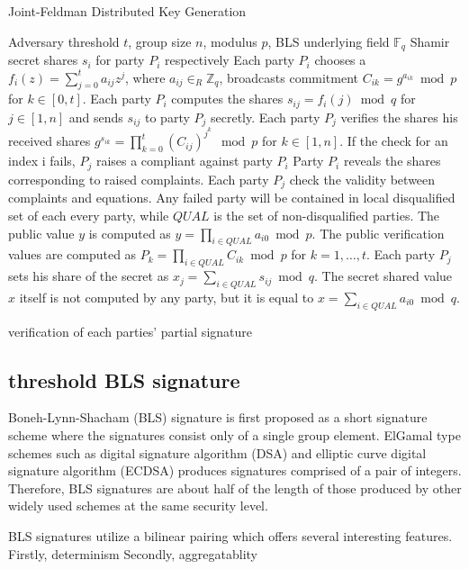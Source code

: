 \documentclass[11pt]{article}
\begin{document}
\begin{algorithm}
\caption{Joint-Feldman Distributed Key Generation\cite{gennaro2007secure}}
\begin{algorithmic}[1]
\Require Adversary threshold $t$, group size $n$, modulus $p$, BLS underlying field $\mathbb{F}_q$
\Ensure Shamir secret shares $s_i$ for party $P_i$ respectively
\State Each party $P_i$ chooses a $f_i(z) = \sum_{j=0}^t a_{ij}z^{j}$, where $a_{ij} \in_R \mathbb{Z}_q$, broadcasts commitment $C_{ik} = g^{a_{ik}} \bmod p$ for $k \in [0,t]$. Each party $P_i$ computes the shares $s_{ij} = f_i(j) \bmod q$ for $j \in [1,n]$ and sends $s_{ij}$ to party $P_j$ secretly.
\State Each party $P_j$ verifies the shares his received shares $g^{s_{ik}} = \prod_{k=0}^t(C_{ij})^{j^k} \mod p$ for $k \in [1,n]$. If the check for an index i fails, $P_j$ raises a compliant against party $P_i$
\State Party $P_i$ reveals the shares corresponding to raised complaints. Each party $P_j$ check the validity between complaints and equations. Any failed party will be contained in local disqualified set of each every party, while $QUAL$ is the set of non-disqualified parties.
\State The public value $y$ is computed as $y = \prod_{i\in QUAL} a_{i0} \bmod p$. The public verification values are computed as $P_k = \prod_{i\in QUAL} C_{ik} \bmod p$ for $k = 1,\dots, t$. Each party $P_j$ sets his share of the secret as $x_j = \sum_{i\in QUAL} s_{ij} \bmod q$. The secret shared value $x$ itself is not computed by any party, but it is equal to $x = \sum_{i \in QUAL} a_{i0} \bmod q$.
\end{algorithmic}
\end{algorithm}


verification of each parties' partial signature

\subsection{threshold BLS signature}

Boneh-Lynn-Shacham (BLS) signature is first proposed as a short signature scheme where the signatures consist only of a single group element. ElGamal type schemes such as digital signature algorithm (DSA) and elliptic curve digital signature algorithm (ECDSA) produces signatures comprised of a pair of integers. Therefore, BLS signatures are about half of the length of those produced by other widely used schemes at the same security level\cite{menezes2009introduction}.

BLS signatures utilize a bilinear pairing which offers several interesting features. Firstly, determinism
Secondly, aggregatablity 
\end{document}
